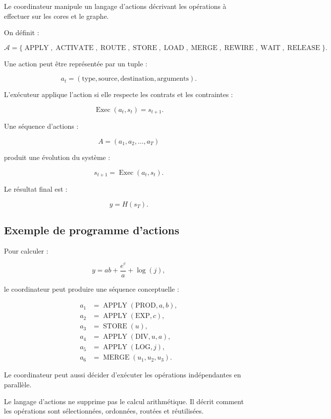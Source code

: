 \documentclass[11pt,a4paper]{article}
\begin{document}
Le coordinateur manipule un langage d'actions décrivant les opérations
à effectuer sur les cores et le graphe.

On définit :

\[
\mathcal{A}
=
\{
\operatorname{APPLY},
\operatorname{ACTIVATE},
\operatorname{ROUTE},
\operatorname{STORE},
\operatorname{LOAD},
\operatorname{MERGE},
\operatorname{REWIRE},
\operatorname{WAIT},
\operatorname{RELEASE}
\}.
\]

Une action peut être représentée par un tuple :

\[
a_t =
(\mathrm{type},\mathrm{source},\mathrm{destination},
\mathrm{arguments}).
\]

L'exécuteur applique l'action si elle respecte les contrats
et les contraintes :

\[
\operatorname{Exec}(a_t,s_t)
=
s_{t+1}.
\]

Une séquence d'actions :

\[
A=(a_1,a_2,\ldots,a_T)
\]

produit une évolution du système :

\[
s_{t+1}
=
\operatorname{Exec}(a_t,s_t).
\]

Le résultat final est :

\[
y=H(s_T).
\]

\subsection{Exemple de programme d'actions}

Pour calculer :

\[
y=ab+\frac{e^c}{a}+\log(j),
\]

le coordinateur peut produire une séquence conceptuelle :

\[
\begin{aligned}
a_1 &= \operatorname{APPLY}(\mathrm{PROD},a,b),\\
a_2 &= \operatorname{APPLY}(\mathrm{EXP},c),\\
a_3 &= \operatorname{STORE}(u),\\
a_4 &= \operatorname{APPLY}(\mathrm{DIV},u,a),\\
a_5 &= \operatorname{APPLY}(\mathrm{LOG},j),\\
a_6 &= \operatorname{MERGE}(u_1,u_2,u_3).
\end{aligned}
\]

Le coordinateur peut aussi décider d'exécuter les opérations
indépendantes en parallèle.

Le langage d'actions ne supprime pas le calcul arithmétique.
Il décrit comment les opérations sont sélectionnées, ordonnées,
routées et réutilisées.
\end{document}
